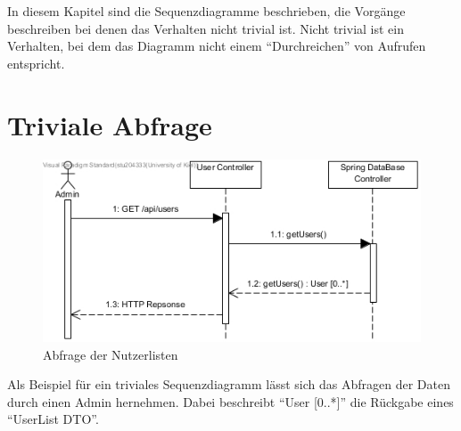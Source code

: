 
In diesem Kapitel sind die Sequenzdiagramme beschrieben, die Vorgänge beschreiben bei denen das Verhalten nicht trivial ist.
Nicht trivial ist ein Verhalten, bei dem das Diagramm nicht einem ``Durchreichen'' von Aufrufen entspricht.
\section{Triviale Abfrage}
\begin{figure}[H]
	\centering
	\includegraphics[width = 12cm]{img/diagrams/TrivialDiagram}
	\caption{Abfrage der Nutzerlisten}
\end{figure}
Als Beispiel für ein triviales Sequenzdiagramm lässt sich das Abfragen der Daten durch einen Admin hernehmen. Dabei beschreibt ``User [0..*]'' die Rückgabe eines ``UserList DTO''.
 
